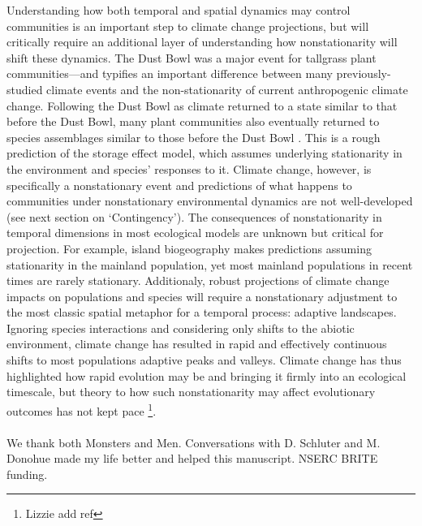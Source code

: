 \documentclass[11pt,a4paper,oneside]{article}
\begin{document}
Understanding how both temporal and spatial dynamics may control communities is an important step to climate change projections, but will critically require an additional layer of understanding how nonstationarity will shift these dynamics. The Dust Bowl was a major event for tallgrass plant communities---and typifies an important difference between many previously-studied climate events and the non-stationarity of current anthropogenic climate change. Following the Dust Bowl as climate returned to a state similar to that before the Dust Bowl, many plant communities also eventually returned to species assemblages similar to those before the Dust Bowl \citep{Weaver1936}. This is a rough prediction of the storage effect model, which assumes underlying stationarity in the environment and species' responses to it. Climate change, however, is specifically a nonstationary event and predictions of what happens to communities under nonstationary environmental dynamics are not well-developed (see next section on `Contingency'). The consequences of nonstationarity in temporal dimensions in most ecological models are unknown but critical for projection. For example, island biogeography makes predictions assuming stationarity in the mainland population, yet most mainland populations in recent times are rarely stationary. Additionaly, robust projections of climate change impacts on populations and species will require a nonstationary adjustment to the most classic spatial metaphor for a temporal process: adaptive landscapes. Ignoring species interactions and considering only shifts to the abiotic environment, climate change has resulted in rapid and effectively continuous shifts to most populations adaptive peaks and valleys. Climate change has thus highlighted how rapid evolution may be and bringing it firmly into an ecological timescale, but theory to how such nonstationarity may affect evolutionary outcomes has not kept pace \footnote{Lizzie add ref}.\\



\\
We thank both Monsters and Men. Conversations with D. Schluter and M. Donohue made my life better and helped this manuscript. NSERC BRITE funding.
\end{document}
